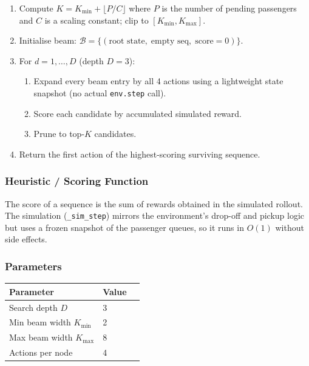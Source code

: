 \documentclass[12pt,a4paper]{article}
\begin{document}
\begin{enumerate}[leftmargin=2em]
    \item Compute $K = K_{\min} + \lfloor P / C \rfloor$ where $P$ is the number of
          pending passengers and $C$ is a scaling constant; clip to $[K_{\min}, K_{\max}]$.
    \item Initialise beam: $\mathcal{B} = \{(\text{root state},\; \text{empty seq},\; \text{score}=0)\}$.
    \item For $d = 1, \ldots, D$ (depth $D=3$):
          \begin{enumerate}[leftmargin=1.5em]
              \item Expand every beam entry by all 4 actions using a lightweight
                    state snapshot (no actual \texttt{env.step} call).
              \item Score each candidate by accumulated simulated reward.
              \item Prune to top-$K$ candidates.
          \end{enumerate}
    \item Return the first action of the highest-scoring surviving sequence.
\end{enumerate}

\subsubsection{Heuristic / Scoring Function}

The score of a sequence is the sum of rewards obtained in the simulated rollout.
The simulation (\texttt{\_sim\_step}) mirrors the environment's drop-off and
pickup logic but uses a frozen snapshot of the passenger queues, so it runs in
$O(1)$ without side effects.

\subsubsection{Parameters}

\begin{center}
\begin{tabular}{lll}
\toprule
\textbf{Parameter}    & \textbf{Value} \\
\midrule
Search depth $D$      & 3 \\
Min beam width $K_{\min}$ & 2 \\
Max beam width $K_{\max}$ & 8 \\
Actions per node      & 4 \\
\bottomrule
\end{tabular}
\end{center}
\end{document}
